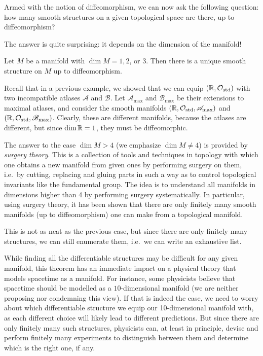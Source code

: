 Armed with the notion of diffeomorphism, we can now ask the following question: how many smooth structures on a given topological space are there, up to diffeomorphism?

The answer is quite surprising: it depends on the dimension of the manifold!

\begin{theorem}
Let $M$ be a manifold with $\dim M = 1, 2$, or $3$. Then there is a unique smooth structure on $M$ up to diffeomorphism.
\end{theorem}

Recall that in a previous example, we showed that we can equip $(\mathbb{R},\mathcal{O}_\mathrm{std})$ with two incompatible atlases $\mathscr{A}$ and $\mathscr{B}$. Let $\mathscr{A}_\mathrm{max}$ and $\mathscr{B}_\mathrm{max}$ be their extensions to maximal atlases, and consider the smooth manifolds $(\mathbb{R},\mathcal{O}_\mathrm{std},\mathscr{A}_\mathrm{max})$ and  $(\mathbb{R},\mathcal{O}_\mathrm{std},\mathscr{B}_\mathrm{max})$. Clearly, these are different manifolds, because the atlases are different, but since $\dim \mathbb{R}=1$, they must be diffeomorphic.

The answer to the case $\dim M > 4$ (we emphasize $\dim M \neq 4$) is provided by \emph{surgery theory}. This is a collection of tools and techniques in topology with which one obtains a new manifold from given ones by performing surgery on them, i.e.\ by cutting, replacing and gluing parts in such a way as to control topological invariants like the fundamental group. The idea is to understand all manifolds in dimensions higher than 4 by performing surgery systematically. In particular, using  surgery theory, it has been shown that there are only finitely many smooth manifolds (up to diffeomorphism) one can make from a topological manifold.

This is not as neat as the previous case, but since there are only finitely many structures, we can still enumerate them, i.e.\ we can write an exhaustive list.

While finding all the differentiable structures may be difficult for any given manifold, this theorem has an immediate impact on a physical theory that models spacetime as a manifold. For instance, some physicists believe that spacetime should be modelled as a $10$-dimensional manifold (we are neither proposing nor condemning this view). If that is indeed the case, we need to worry about which differentiable structure we equip our 10-dimensional manifold with, as each different choice will likely lead to different predictions. But since there are only finitely many such structures, physicists can, at least in principle, devise and perform finitely many experiments to distinguish between them and determine which is the right one, if any.

